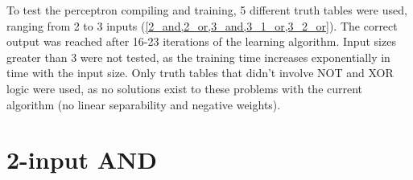 
To test the perceptron compiling and training, 5 different truth tables were used, ranging from 2 to 3 inputs (\cref{2_and,2_or,3_and,3_1_or,3_2_or}). The correct output was reached after 16-23 iterations of the learning algorithm. Input sizes greater than 3 were not tested, as the training time increases exponentially in time with the input size. Only truth tables that didn't involve NOT and XOR logic were used, as no solutions exist to these problems with the current algorithm (no linear separability and negative weights).


\section{2-input AND}

\begin{figure}[H]
  \begin{subfigure}[t]{.49\columnwidth}


\end{subfigure}
\end{figure}
